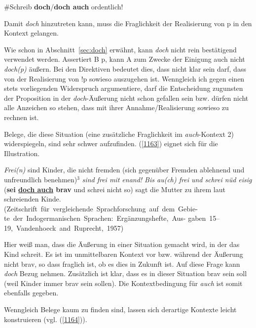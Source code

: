 {\begin{exe}
	\ex\label{1162} 
	\#Schreib \textbf{doch}/\textbf{doch auch} ordentlich!
\end{exe}
Damit \textit{doch} hinzutreten kann, muss die Fraglichkeit der Realisierung von p in den Kontext gelangen.

Wie schon in Abschnitt~\ref{sec:doch} erwähnt, kann \textit{doch} nicht rein bestätigend verwendet werden. Assertiert B p, kann A zum Zwecke der Einigung auch nicht \textit{doch(p)} äußern. Bei den Direktiven bedeutet dies, dass nicht klar sein darf, dass von der Realisierung von !p sowieso auszugehen ist. Wenngleich ich gegen einen stets vorliegenden Widerspruch argumentiere, darf die Entscheidung zugunsten der Proposition in der \textit{doch}-Äußerung nicht schon gefallen sein bzw. dürfen nicht alle Anzeichen so stehen, dass mit ihrer Annahme/Realisierung sowieso zu rechnen ist.

Belege, die diese Situation (eine zusätzliche Fraglichkeit im \textit{auch}-Kontext 2) widerspiegeln, sind sehr schwer aufzufinden. (\ref{1163}) eignet sich für die Illustration.

\begin{exe}
	\ex\label{1163} 
	\scriptsize
	\textit{Frei(n)} sind Kinder, \glqq die nicht fremden\grqq{} (sich gegenüber Fremden ablehnend und unfreundlich benehmen)$^{3}$ \textit{sind frei mit enand! 	Bis au(ch) frei und schrei nüd eisig} (\textbf{sei \underline{doch auch} brav} und schrei nicht so) sagt die Mutter zu ihrem laut schreienden Kinde.
	\newline
	\hbox{}\hfill\hbox{(Zeitschrift für vergleichende Sprachforschung auf dem Gebie-}
	\newline
	\hbox{}\hfill\hbox{te der Indogermanischen Sprachen: Ergänzungshefte, Aus-}
	\newline
	\hbox{}\hfill\hbox{gaben 15–19, Vandenhoeck and Ruprecht, 1957)}
\end{exe}
Hier weiß man, dass die Äußerung in einer Situation gemacht wird, in der das Kind schreit. Es ist im unmittelbaren Kontext vor bzw. während der Äußerung nicht brav, so dass fraglich ist, ob es dies in Zukunft ist. Auf diese Frage kann \textit{doch} Bezug nehmen. Zusätzlich ist klar, dass es in dieser Situation brav sein soll (weil Kinder immer brav sein sollen). Die Kontextbedingung für \textit{auch} ist somit ebenfalls gegeben.

Wenngleich Belege kaum zu finden sind, lassen sich derartige Kontexte leicht konstruieren (vgl. (\ref{1164})).

}

